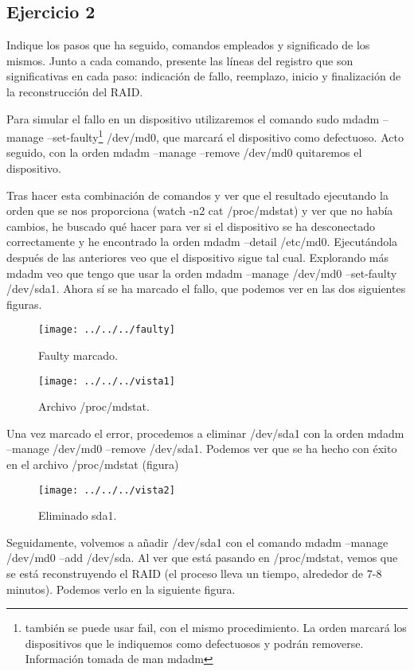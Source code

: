 \documentclass[a4paper, 11pt]{article} %
\begin{document}
\subsection{Ejercicio 2}
Indique los pasos que ha seguido, comandos empleados y significado de los mismos. Junto a cada comando, presente las líneas del registro que son significativas en cada paso: indicación de fallo, reemplazo, inicio y finalización de la reconstrucción del RAID.

Para simular el fallo en un dispositivo utilizaremos el comando sudo mdadm --manage --set-faulty\footnote{también se puede usar fail, con el mismo procedimiento. La orden marcará los dispositivos que le indiquemos como defectuosos y podrán removerse. Información tomada de man mdadm} /dev/md0, que marcará el dispositivo como defectuoso. Acto seguido, con la orden mdadm --manage --remove /dev/md0 quitaremos el dispositivo. 

Tras hacer esta combinación de comandos y ver que el resultado ejecutando la orden que se nos proporciona (watch -n2 cat /proc/mdstat) y ver que no había cambios, he buscado qué hacer para ver si el dispositivo se ha desconectado correctamente y he encontrado la orden mdadm --detail /etc/md0. Ejecutándola después de las anteriores veo que el dispositivo sigue tal cual. Explorando más mdadm veo que tengo que usar la orden mdadm --manage /dev/md0 --set-faulty /dev/sda1. Ahora sí se ha marcado el fallo, que podemos ver en las dos siguientes figuras. 
\pagebreak

\begin{figure}[htpb]
\centering
\texttt{[image: ../../../faulty]}
\caption{Faulty marcado.}
\end{figure}

\begin{figure}[htpb]
\centering
\texttt{[image: ../../../vista1]}
\caption{Archivo /proc/mdstat.}
\end{figure}

Una vez marcado el error, procedemos a eliminar /dev/sda1 con la orden mdadm --manage /dev/md0 --remove /dev/sda1. Podemos ver que se ha hecho con éxito en el archivo /proc/mdstat (figura) 

\begin{figure}[htpb]
\centering
\texttt{[image: ../../../vista2]}
\caption{Eliminado sda1.}
\end{figure}

Seguidamente, volvemos a añadir /dev/sda1 con el comando mdadm --manage /dev/md0 --add /dev/sda. Al ver que está pasando en /proc/mdstat, vemos que se está reconstruyendo el RAID (el proceso lleva un tiempo, alrededor de 7-8 minutos). Podemos verlo en la siguiente figura.
\end{document}

